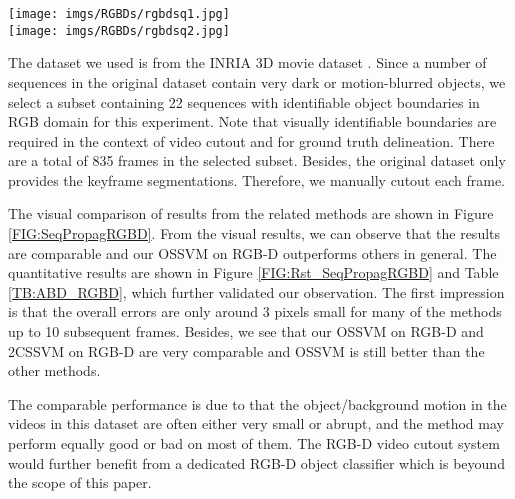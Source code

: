 \documentclass[10pt,journal,compsoc]{newIEEEtran}
\begin{document}
\begin{table*}
\end{table*}\begin{figure*}[!t]
	\centering
	\texttt{[image: imgs/RGBDs/rgbdsq1.jpg]}\\
	\texttt{[image: imgs/RGBDs/rgbdsq2.jpg]}
	\caption{Segmentation results on two RGB-D sequences (zoom in to see details). In each example, the left most is the initial keyframe segmentation. From the second left to the end are the results by Zhong et al.'s classifier \cite{Zhong2012UDC_SIGGRAPHAsia}, Classifier with Matting, OSSVM with RGB only, uniform weights for GC on RGB-D, 2CSSVM for RGB-D and OSSVM for RGB-D. The top row shows the result on the 5th frame from the keyframe, and the bottom row shows the zoom-in for the boxed regions in the top row.}\label{FIG:SeqPropagRGBD}\vspace{-0.5cm}
\end{figure*}

The dataset we used is from the INRIA 3D movie dataset \cite{Seguin153DMovie}. Since a number of sequences in the original dataset contain very dark or motion-blurred objects, we select a subset containing 22 sequences with identifiable object boundaries in RGB domain for this experiment. Note that visually identifiable boundaries are required in the context of video cutout and for ground truth delineation. There are a total of 835 frames in the selected subset. Besides, the original dataset only provides the keyframe segmentations. Therefore, we manually cutout each frame.

The visual comparison of results from the related methods are shown in Figure \ref{FIG:SeqPropagRGBD}. From the visual results, we can observe that the results are comparable and our OSSVM on RGB-D outperforms others in general. The quantitative results are shown in Figure \ref{FIG:Rst_SeqPropagRGBD} and Table \ref{TB:ABD_RGBD}, which further validated our observation. The first impression is that the overall errors are only around 3 pixels small for many of the methods up to 10 subsequent frames. Besides, we see that our OSSVM on RGB-D and 2CSSVM on RGB-D are very comparable and OSSVM is still better than the other methods.

The comparable performance is due to that the object/background motion in the videos in this dataset are often either very small or abrupt, and the method may perform equally good or bad on most of them. The RGB-D video cutout system would further benefit from a dedicated RGB-D object classifier which is beyound the scope of this paper.
\end{document}

